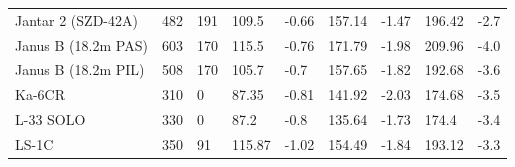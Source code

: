 \documentclass[a4paper,12pt]{refrep}
\begin{document}
\begin{maxipage}
\begin{small}
\begin{longtable}{l l l l l l l l l}
Jantar 2 (SZD-42A) & 482 & 191 & 109.5 & -0.66 & 157.14 & -1.47 & 196.42 & -2.7 \\
Janus B (18.2m PAS) & 603 & 170 & 115.5 & -0.76 & 171.79 & -1.98 & 209.96 & -4.0 \\
Janus B (18.2m PIL) & 508 & 170 & 105.7 & -0.7 & 157.65 & -1.82 & 192.68 & -3.6 \\
Ka-6CR & 310 & 0 & 87.35 & -0.81 & 141.92 & -2.03 & 174.68 & -3.5 \\
L-33 SOLO & 330 & 0 & 87.2 & -0.8 & 135.64 & -1.73 & 174.4 & -3.4 \\
LS-1C & 350 & 91 & 115.87 & -1.02 & 154.49 & -1.84 & 193.12 & -3.3 \\
\bottomrule
\end{longtable}
\end{small}
\end{maxipage}
\end{document}
